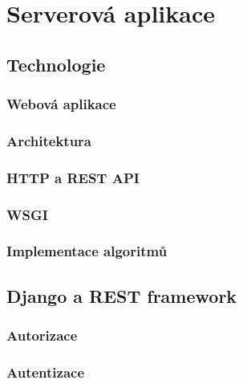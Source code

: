 \documentclass[a4paper,11pt,titlepage,fleqn]{article}
\begin{document}
\newpage
\section{Serverová aplikace}
    
    \subsection{Technologie}
        \subsubsection{Webová aplikace}

        \subsubsection{Architektura}

        \subsubsection{HTTP a REST API}

        \subsubsection{WSGI}

        \subsubsection{Implementace algoritmů}

    \subsection{Django a REST framework}
        
        \subsubsection{Autorizace}

        \subsubsection{Autentizace}
\end{document}
